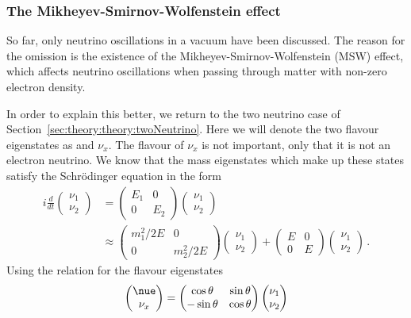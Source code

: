 \subsubsection{The Mikheyev-Smirnov-Wolfenstein effect}
\label{sec:theory:theory:msw}
So far, only neutrino oscillations in a vacuum have been discussed.
The reason for the omission is the existence of the Mikheyev-Smirnov-Wolfenstein (MSW) effect, which affects neutrino oscillations when passing through matter with non-zero electron density.

In order to explain this better, we return to the two neutrino case of Section~\ref{sec:theory:theory:twoNeutrino}.
Here we will denote the two flavour eigenstates as \nue and $\nu_{x}$.
The flavour of $\nu_{x}$ is not important, only that it is not an electron neutrino.
We know that the mass eigenstates which make up these states satisfy the Schr\"odinger equation in the form
\begin{align}
  i \frac{d}{dt}
  \begin{pmatrix}
    \nu_{1} \\
    \nu_{2}
  \end{pmatrix}
  &=
  \begin{pmatrix}
    E_{1} & 0 \\
    0     & E_{2}
  \end{pmatrix}
  \begin{pmatrix}
    \nu_{1} \\
    \nu_{2}
  \end{pmatrix} \\
  & \approx
  \begin{pmatrix}
    m_{1}^{2}/2E & 0 \\
    0 & m_{2}^{2}/2E
  \end{pmatrix}
  \begin{pmatrix}
    \nu_{1} \\
    \nu_{2}
  \end{pmatrix}
  +
  \begin{pmatrix}
    E & 0 \\
    0 & E 
  \end{pmatrix}
  \begin{pmatrix}
    \nu_{1} \\
    \nu_{2}
  \end{pmatrix} \, .  
\end{align}
Using the relation for the flavour eigenstates
\begin{equation}
  \begin{pmatrix}
    \nue \\
    \nu_{x}
  \end{pmatrix}
  =
  \begin{pmatrix}
    \cos\theta & \sin\theta \\
    -\sin\theta & \cos\theta
  \end{pmatrix}
  \begin{pmatrix}
    \nu_{1} \\
    \nu_{2}
  \end{pmatrix}
\end{equation}
